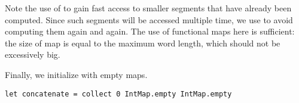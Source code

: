 Note the use of  to gain fast access to smaller
segments that have already been computed. Since such segments will be accessed
multiple time, we use  to avoid computing them again and again.
The use of functional maps here is sufficient: the size of map is equal
to the maximum word length, which should not be excessively big.

Finally, we initialize  with empty maps.
\begin{lstlisting}
let concatenate = collect 0 IntMap.empty IntMap.empty
\end{lstlisting}


